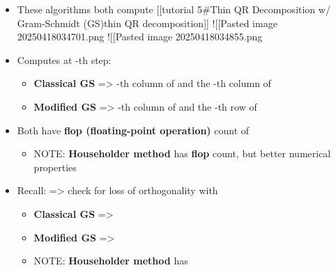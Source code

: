 \begin{itemize}

  \item
        These algorithms both compute {[}{[}tutorial 5\#Thin QR Decomposition
        w/ Gram-Schmidt (GS)\textbar thin QR decomposition{]}{]} !{[}{[}Pasted
        image 20250418034701.png\textbar400{]}{]} !{[}{[}Pasted image
        20250418034855.png\textbar400{]}{]}
  \item
        Computes at -th step:

        \begin{itemize}

          \item
                \textbf{Classical GS} =\textgreater{} -th column of
                 and the -th column of 
          \item
                \textbf{Modified GS} =\textgreater{} -th column of
                 and the -th row of 
        \end{itemize}
  \item
        Both have \textbf{flop (floating-point operation)} count of

        \begin{itemize}

          \item
                NOTE: \textbf{Householder method} has
                 \textbf{flop} count,
                but better numerical properties
        \end{itemize}
  \item
        Recall:  =\textgreater{}
        check for loss of orthogonality with

        \begin{itemize}

          \item
                \textbf{Classical GS} =\textgreater{}
          \item
                \textbf{Modified GS} =\textgreater{}
          \item
                NOTE: \textbf{Householder method} has
        \end{itemize}
\end{itemize}

